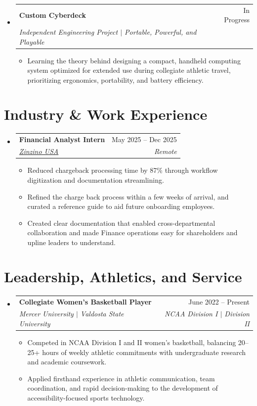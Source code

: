 \documentclass[letterpaper,11.000000001 pt]{article}
\makeatletter
\newcommand{\resumeItem}[1]{
  \item\small{
    {#1 \vspace{-1pt}}
  }
}
\newcommand{\resumeSubheading}[4]{
  \vspace{-1pt}\item
    \begin{tabular*}{0.97\textwidth}[t]{l@{\extracolsep{\fill}}r}
      \textbf{#1} & #2 \\
      \textit{\small#3} & \textit{\small #4} \\
    \end{tabular*}\vspace{-6pt}
}
\newcommand{\resumeProjectHeading}[2]{
  \item
  \begin{tabularx}{\linewidth}{@{}Xr@{}}
    \small #1 & \small #2 \\
  \end{tabularx}\vspace{-6pt}
}
\renewcommand{\resumeProjectHeading}[2]{
  \item
  \begin{tabularx}{\linewidth}{@{}>{\raggedright\arraybackslash}X@{\hspace{0.5em}}r@{}}
    \small #1 & \small #2 \\
  \end{tabularx}\vspace{-8pt}
}
\newcommand{\resumeSubHeadingListStart}{\begin{itemize}[leftmargin=0.15in, label={}]}
\newcommand{\resumeSubHeadingListEnd}{\end{itemize}}
\newcommand{\resumeItemListStart}{\begin{itemize}}
\newcommand{\resumeItemListEnd}{\end{itemize}\vspace{-5pt}}
\makeatother
\begin{document}
    \resumeSubHeadingListStart
      \resumeSubheading
        {\textbf{Custom Cyberdeck}}{In Progress}
        {Independent Engineering Project $|$ Portable, Powerful, and Playable}{}
        \resumeItemListStart
          \resumeItem{Learning the theory behind designing a compact, handheld computing system optimized for extended use during collegiate athletic travel, prioritizing ergonomics, portability, and battery efficiency.}
        \resumeItemListEnd
      \resumeSubHeadingListEnd

\section{Industry \& Work Experience}
  \resumeSubHeadingListStart  
    \resumeSubheading
      {Financial Analyst Intern}{May 2025 – Dec 2025}
      {\href{https://www.zinzino.com/site/us/en-us/}{Zinzino USA}}{Remote}
      \resumeItemListStart
        \resumeItem{Reduced chargeback processing time by 87\% through workflow digitization and documentation streamlining.}
        \resumeItem{Refined the charge back process within a few weeks of arrival, and curated a reference guide to aid future onboarding employees.}
        \resumeItem{Created clear documentation that enabled cross-departmental collaboration and made Finance operations easy for shareholders and upline leaders to understand.}
      \resumeItemListEnd
  \resumeSubHeadingListEnd


\section{Leadership, Athletics, and Service}
  \resumeSubHeadingListStart  
    \resumeSubheading
      {Collegiate Women's Basketball Player}{June 2022 -- Present}
      {Mercer University $|$ Valdosta State University}{NCAA Division I $|$ Division II}
      \resumeItemListStart
        \resumeItem{Competed in NCAA Division I and II women's basketball, balancing 20–25+ hours of weekly athletic commitments with undergraduate research and academic coursework.}
        \resumeItem{Applied firsthand experience in athletic communication, team coordination, and rapid decision-making to the development of accessibility-focused sports technology.}
      \resumeItemListEnd
  \resumeSubHeadingListEnd
    
\end{document}
